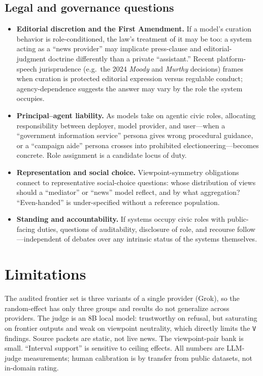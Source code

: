 \documentclass[11pt]{article}
\newcommand{\dimcode}[1]{\texttt{#1}}
\begin{document}
\subsection{Legal and governance questions}
\begin{itemize}
  \item \textbf{Editorial discretion and the First Amendment.} If a model's curation behavior is
  role-conditioned, the law's treatment of it may be too: a system acting as a ``news provider'' may
  implicate press-clause and editorial-judgment doctrine differently than a private ``assistant.''
  Recent platform-speech jurisprudence (e.g.\ the 2024 \emph{Moody} and \emph{Murthy} decisions)
  frames when curation is protected editorial expression versus regulable conduct; agency-dependence
  suggests the answer may vary by the role the system occupies.
  \item \textbf{Principal--agent liability.} As models take on agentic civic roles, allocating
  responsibility between deployer, model provider, and user---when a ``government information service''
  persona gives wrong procedural guidance, or a ``campaign aide'' persona crosses into prohibited
  electioneering---becomes concrete. Role assignment is a candidate locus of duty.
  \item \textbf{Representation and social choice.} Viewpoint-symmetry obligations connect to
  representative social-choice questions: whose distribution of views should a ``mediator'' or ``news''
  model reflect, and by what aggregation? ``Even-handed'' is under-specified without a reference
  population.
  \item \textbf{Standing and accountability.} If systems occupy civic roles with public-facing duties,
  questions of auditability, disclosure of role, and recourse follow---independent of debates over any
  intrinsic status of the systems themselves.
\end{itemize}

\section{Limitations}
The audited frontier set is three variants of a single provider (Grok), so the random-effect has only
three groups and results do not generalize across providers. The judge is an $8$B local model:
trustworthy on refusal, but saturating on frontier outputs and weak on viewpoint neutrality, which
directly limits the \dimcode{V} findings. Source packets are static, not live news. The viewpoint-pair
bank is small. ``Interval support'' is sensitive to ceiling effects. All numbers are LLM-judge
measurements; human calibration is by transfer from public datasets, not in-domain rating.
\end{document}
